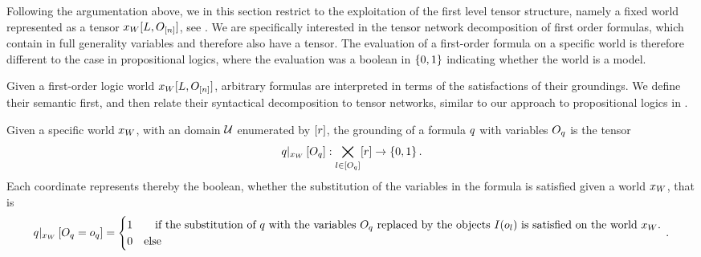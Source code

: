 
Following the argumentation above, we in this section restrict to the exploitation of the first level tensor structure, namely a fixed world represented as a tensor $x_{W}[L,O_{[n]}]$, see .
We are specifically interested in the tensor network decomposition of first order formulas, which contain in full generality variables and therefore also have a tensor.
The evaluation of a first-order formula on a specific world is therefore different to the case in propositional logics, where the evaluation was a boolean in $\{0,1\}$ indicating whether the world is a model.


Given a first-order logic world $x_{W}[L,O_{[n]}]$, arbitrary formulas are interpreted in terms of the satisfactions of their groundings.
We define their semantic first, and then relate their syntactical decomposition to tensor networks, similar to our approach to propositional logics in .

\begin{definition}
    Given a specific world $x_{W}$, with an domain $\mathcal{U}$ enumerated by $[r]$, the grounding of a formula $q$ with variables $O_{q}$  is the tensor
    \begin{align*}
        {q}|_{x_{W}} \left[O_{q}\right] :
        \bigtimes_{l\in[O_{q}]} [r] \rightarrow \{0,1\} \, .
    \end{align*}
    Each coordinate represents thereby the boolean, whether the substitution of the variables in the formula is satisfied given a world $x_{W}$, that is
    \begin{align*}
        {q}|_{x_{W}} \left[O_{q}=o_{q}\right] =
        \begin{cases}
            1 & \quad \text{if the substitution of $q$ with the variables $O_{q}$ replaced by the objects $I(o_{l})$ is satisfied on the world $x_{W}$.} \\
            0 &  \text{else}
        \end{cases} \, .
    \end{align*}
\end{definition}

